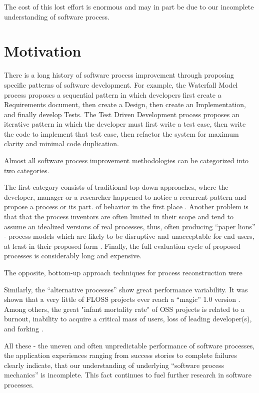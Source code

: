The cost of this lost effort is enormous and may in part be due to our incomplete understanding of software process.


\section{Motivation}
There is a long history of software process improvement through proposing specific patterns of 
software development. 
For example, the Waterfall Model process proposes a sequential pattern in which 
developers first create a Requirements document, then create a Design, then create an Implementation, and 
finally develop Tests. 
The Test Driven Development process proposes an iterative pattern in which the developer must first write a test case, 
then write the code to implement that test case, then refactor the system for maximum clarity and minimal 
code duplication. 

Almost all software process improvement methodologies can be categorized into two categories. 

The first category consists of traditional top-down approaches, where the developer, manager or a researcher 
happened to notice a recurrent pattern and propose a process or its part.
of behavior in the first place \cite{citeulike:5043104}. 
Another problem is that that the process inventors are often limited in their scope and tend to assume an idealized 
versions of real processes, thus, often producing ``paper lions'' - process models which are likely to be disruptive 
and unacceptable for end users, at least in their proposed form \cite{citeulike:9758924}. 
Finally, the full evaluation cycle of proposed processes is considerably long and expensive.

The opposite, bottom-up approach techniques for process reconstruction were 

Similarly, the ``alternative processes'' show great performance variability. It was shown that a very little of 
FLOSS projects ever reach a ``magic'' 1.0 version \cite{citeulike:12480029}. Among others, 
the great "infant mortality rate" of OSS projects is related to a burnout, inability to acquire a critical 
mass of users, loss of leading developer(s), and forking \cite{richter2007critique}.

All these - the uneven and often unpredictable performance of software processes, the application experiences 
ranging from success stories to complete failures clearly indicate, that our understanding of underlying 
``software process mechanics'' is incomplete. This fact continues to fuel further research in software processes.



